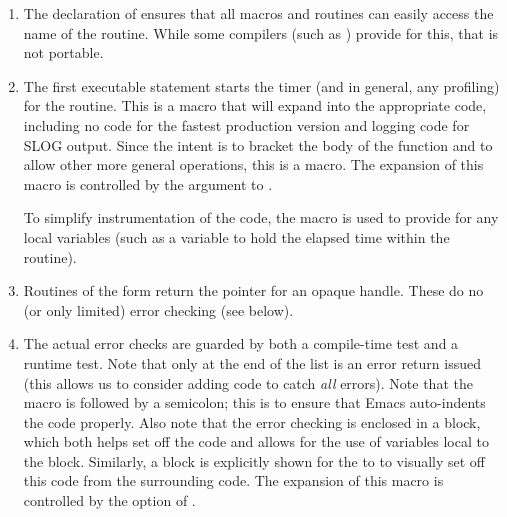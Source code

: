 \documentclass{article}
\begin{document}
\begin{enumerate}
\item The declaration of  ensures that all
  macros and 
  routines can easily access the name of the routine.  While some
  compilers (such as ) provide  for this,
  that is not portable.

\item 
  The first executable statement starts the timer (and in general,
  any profiling) for the routine.  This
  is a macro that will expand into the appropriate code, including no code for
  the fastest production version and logging code for SLOG output.
  Since the intent is to bracket the body of the function and to
  allow other more general operations, this is a macro.
  The expansion of this macro is controlled by the
   argument to .
  
  To simplify instrumentation of the code, the macro
   is used to provide for any local
  variables (such as a variable to hold the elapsed time within the routine).


\item Routines of the form  return the pointer
  for an opaque handle.  These do no (or only limited) error checking (see
   below).

\item The actual error checks are guarded by both a compile-time test and a
  runtime test.  Note that only at the end of the list is an error return
  issued (this allows us to consider adding code to catch \emph{all}
  errors).  Note that the macro  is
  followed by a semicolon; this is to ensure that Emacs auto-indents the
  code properly.
  Also note that the error checking is enclosed in a block, which
  both helps set off the code and allows for the use of variables
  local to the block.  Similarly, a block is explicitly shown for the
   to  to
  visually set off this code from the surrounding code.
  The expansion of this macro is controlled by the
 option of .


\end{enumerate}
\end{document}

